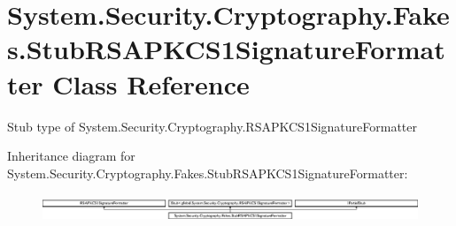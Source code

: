 \hypertarget{class_system_1_1_security_1_1_cryptography_1_1_fakes_1_1_stub_r_s_a_p_k_c_s1_signature_formatter}{\section{System.\-Security.\-Cryptography.\-Fakes.\-Stub\-R\-S\-A\-P\-K\-C\-S1\-Signature\-Formatter Class Reference}
\label{class_system_1_1_security_1_1_cryptography_1_1_fakes_1_1_stub_r_s_a_p_k_c_s1_signature_formatter}
}


Stub type of System.\-Security.\-Cryptography.\-R\-S\-A\-P\-K\-C\-S1\-Signature\-Formatter 


Inheritance diagram for System.\-Security.\-Cryptography.\-Fakes.\-Stub\-R\-S\-A\-P\-K\-C\-S1\-Signature\-Formatter\-:\begin{figure}[H]
\begin{center}
\leavevmode
\includegraphics[height=0.811594cm]{class_system_1_1_security_1_1_cryptography_1_1_fakes_1_1_stub_r_s_a_p_k_c_s1_signature_formatter}
\end{center}
\end{figure}
